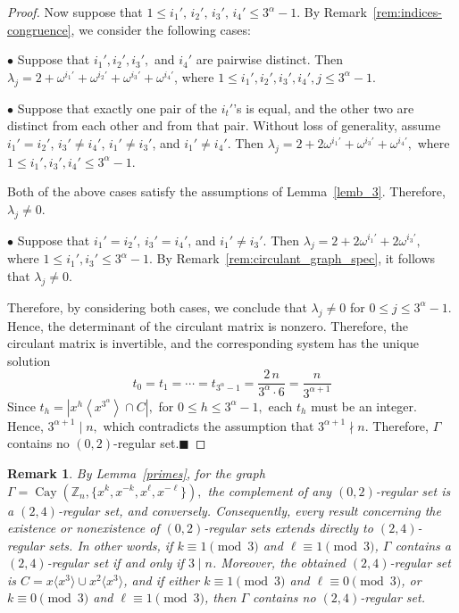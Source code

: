 \documentclass[12pt]{article}
\newtheorem{remA}[propA]{Remark}
\begin{document}
\begin{proof}
 Now suppose that $1\le i_1',\,i_2',\,i_3',\,i_4'\le3^\alpha-1$. By Remark~\ref{rem:indices-congruence}, we consider the following cases:

 $\bullet$
 Suppose that $i_1', i_2', i_3',$ and $i_4'$ are pairwise distinct. Then 	$
 \lambda_j=2+\omega^{i_1'}+\omega^{i_2'}+\omega^{i_3'}+\omega^{i_4'}
 $, where 	$
 1\le i_1',i_2',i_3',i_4',j\le3^\alpha-1
 $.

 \medskip

 $\bullet$
 Suppose that exactly one pair of the $i_t'$'s is equal, and the other two are distinct from each other and from that pair. Without loss of generality, assume $i_1'=i_2'$, $i_3'\neq i_4'$, $i_1'\neq i_3'$, and $i_1'\neq i_4'$. Then
 $
 \lambda_j=2+2\omega^{i_1'}+\omega^{i_3'}+\omega^{i_4'},
 $
 where $1\le i_1',i_3',i_4'\le 3^\alpha-1$.
 \medskip

Both of the above cases satisfy the assumptions of Lemma~\ref{lemb_3}. Therefore, $\lambda_j\neq0$.

 $\bullet$
 Suppose that $i_1'=i_2'$, $i_3'=i_4'$, and $i_1'\neq i_3'$. Then
 $
 \lambda_j=2+2\omega^{i_1'}+2\omega^{i_3'},
 $
 where $1\le i_1',i_3'\le 3^\alpha-1$. By Remark~\ref{rem:circulant_graph_spec}, it follows that $\lambda_j\neq 0$.

 Therefore, by considering both cases, we conclude that
 $
 \lambda_j\neq0$ for $0\le j\le3^{\alpha}-1.
 $
 Hence, the determinant of the circulant matrix is nonzero. Therefore, the circulant matrix is invertible, and the corresponding system has the unique solution
 \[
 t_0=t_1=\cdots=t_{3^{\alpha}-1}
 =\frac{2\,n}{3^{\alpha}\cdot6}
 =\frac{n}{3^{\alpha+1}}
 \]
 Since
 $
 t_h=\left|x^h\left\langle x^{3^{\alpha}}\right\rangle\cap C\right|,$ for
 $0\le h\le3^{\alpha}-1,
 $
 each \(t_h\) must be an integer. Hence,
 $
 3^{\alpha+1}\mid n,
 $
 which contradicts the assumption that
 $
 3^{\alpha+1}\nmid n.
 $
 Therefore, \(\Gamma\) contains no \((0,2)\)-regular set.\hfill$\blacksquare$
 \end{proof}   	
\begin{remA}\label{rem:24}
	By Lemma~\ref{primes}, for the graph $\Gamma=\operatorname{Cay}(\mathbb{Z}_n,\{x^k,x^{-k},x^\ell,x^{-\ell}\}),$
	the complement of any \((0,2)\)-regular set is a \((2,4)\)-regular set, and conversely. Consequently, every result concerning the existence or nonexistence of \((0,2)\)-regular sets extends directly to \((2,4)\)-regular sets. In other words, if \(k\equiv 1 \pmod{3}\) and \(\ell\equiv 1 \pmod{3}\), \(\Gamma\) contains a \((2,4)\)-regular set if and only if \(3\mid n\). Moreover, the obtained \((2,4)\)-regular set is \(C=x\langle x^3\rangle \cup x^2\langle x^3\rangle\), and if either \(k\equiv 1 \pmod{3}\) and \(\ell\equiv 0 \pmod{3}\), or \(k\equiv 0 \pmod{3}\) and \(\ell\equiv 1 \pmod{3}\), then \(\Gamma\) contains no \((2,4)\)-regular set.
\end{remA}	
\end{document}
